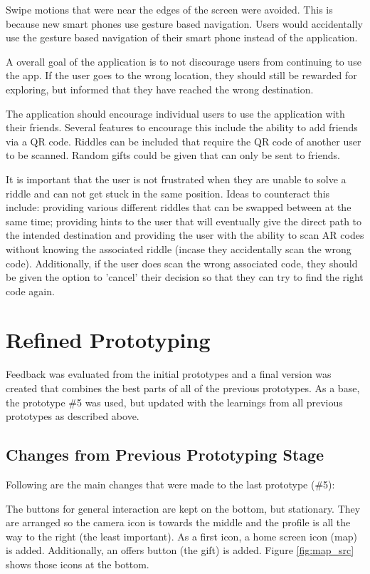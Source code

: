 \documentclass[10pt,twocolumn]{article} %
\begin{document}
Swipe motions that were near the edges of the screen were avoided. This is because new smart phones use gesture based navigation. Users would accidentally use the gesture based navigation of their smart phone instead of the application.

A overall goal of the application is to not discourage users from continuing to use the app. If the user goes to the wrong location, they should still be rewarded for exploring, but informed that they have reached the wrong destination.

The application should encourage individual users to use the application with their friends. Several features to encourage this include the ability to add friends via a QR code. Riddles can be included that require the QR code of another user to be scanned. Random gifts could be given that can only be sent to friends.

It is important that the user is not frustrated when they are unable to solve a riddle and can not get stuck in the same position. Ideas to counteract this include: providing various different riddles that can be swapped between at the same time; providing hints to the user that will eventually give the direct path to the intended destination and providing the user with the ability to scan AR codes without knowing the associated riddle (incase they accidentally scan the wrong code). Additionally, if the user does scan the wrong associated code, they should be given the option to 'cancel' their decision so that they can try to find the right code again.

\section*{Refined Prototyping}

Feedback was evaluated from the initial prototypes and a final version was created that combines the best parts of all of the previous prototypes.
As a base, the prototype \#5 was used, but updated with the learnings from all previous prototypes as described above. 


\subsection*{Changes from Previous Prototyping Stage}
Following are the main changes that were made to the last prototype (\#5): 

The buttons for general interaction are kept on the bottom, but stationary. They are arranged so the camera icon is towards the middle and the profile is all the way to the right (the least important). As a first icon, a home screen icon (map) is added. Additionally, an offers button (the gift) is added. Figure \ref{fig:map_src} shows those icons at the bottom.
 
\end{document}
